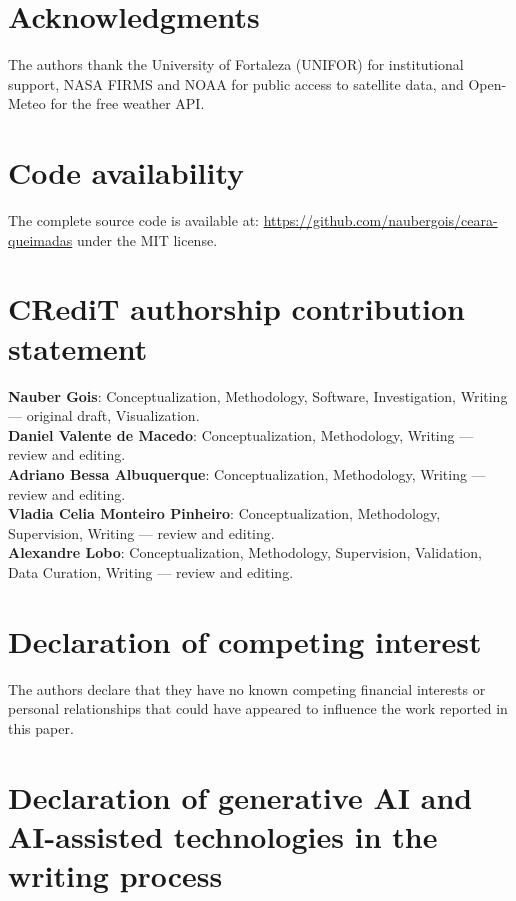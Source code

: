 \documentclass[preprint,times,numbers]{elsarticle}
\begin{document}
\section*{Acknowledgments}

The authors thank the University of Fortaleza (UNIFOR) for institutional support, NASA FIRMS and NOAA for public access to satellite data, and Open-Meteo for the free weather API.

\section*{Code availability}

The complete source code is available at: \url{https://github.com/naubergois/ceara-queimadas} under the MIT license.

\section*{CRediT authorship contribution statement}
\label{sec:credit}

\textbf{Nauber Gois}: Conceptualization, Methodology, Software, Investigation, Writing --- original draft, Visualization.\\
\textbf{Daniel Valente de Macedo}: Conceptualization, Methodology, Writing --- review and editing.\\
\textbf{Adriano Bessa Albuquerque}: Conceptualization, Methodology, Writing --- review and editing.\\
\textbf{Vladia Celia Monteiro Pinheiro}: Conceptualization, Methodology, Supervision, Writing --- review and editing.\\
\textbf{Alexandre Lobo}: Conceptualization, Methodology, Supervision, Validation, Data Curation, Writing --- review and editing.

\section*{Declaration of competing interest}

The authors declare that they have no known competing financial interests or personal relationships that could have appeared to influence the work reported in this paper.

\section*{Declaration of generative AI and AI-assisted technologies in the writing process}
\end{document}
